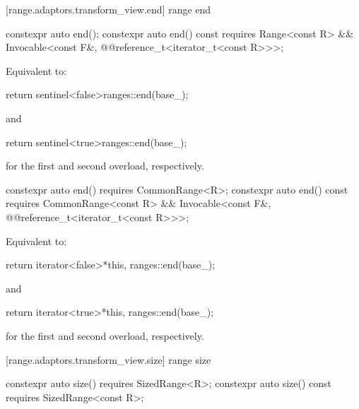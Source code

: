 [range.adaptors.transform_view.end]{ range end}

%
\begin{itemdecl}
constexpr auto end();
constexpr auto end() const requires Range<const R> &&
  Invocable<const F&, @@reference_t<iterator_t<const R>>>;
\end{itemdecl}

\begin{itemdescr}
\pnum
\effects Equivalent to:
\begin{codeblock}
return sentinel<false>{ranges::end(base_)};
\end{codeblock}
  and
\begin{codeblock}
return sentinel<true>{ranges::end(base_)};
\end{codeblock}
for the first and second overload, respectively.
\end{itemdescr}

%
\begin{itemdecl}
constexpr auto end() requires CommonRange<R>;
constexpr auto end() const requires CommonRange<const R> &&
  Invocable<const F&, @@reference_t<iterator_t<const R>>>;
\end{itemdecl}

\begin{itemdescr}
\pnum
\effects Equivalent to:
\begin{codeblock}
return iterator<false>{*this, ranges::end(base_)};
\end{codeblock}
  and
\begin{codeblock}
return iterator<true>{*this, ranges::end(base_)};
\end{codeblock}
for the first and second overload, respectively.
\end{itemdescr}

[range.adaptors.transform_view.size]{ range size}

%
\begin{itemdecl}
constexpr auto size() requires SizedRange<R>;
constexpr auto size() const requires SizedRange<const R>;
\end{itemdecl}

\begin{itemdescr}
\pnum
\oldtxt{\returns}  
\end{itemdescr}


